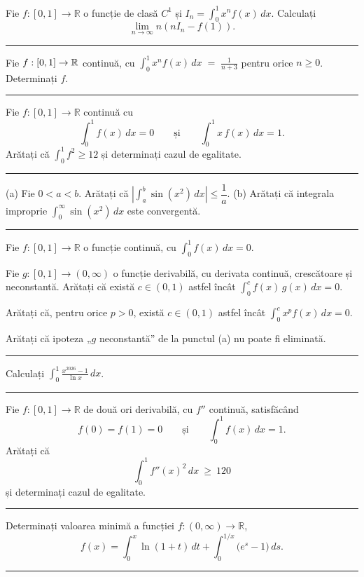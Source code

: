 Fie $f:[0,1]\to\mathbb{R}$ o funcție de clasă $C^1$ și
$\displaystyle I_n=\int_0^1 x^n f(x)\,dx$. Calculați
\[ \lim_{n\to\infty} n\left(n I_n - f(1)\right). \]
\vspace{1mm}\hrule

Fie $f : [0,1] \to \mathbb{R}$ continuă, cu $\displaystyle\int_0^1 x^n f(x)\,dx \;=\; \frac{1}{n+3}$ pentru orice $n \ge 0$. Determinați $f$.
\vspace{1mm}\hrule

Fie $f:[0,1]\to\mathbb{R}$ continuă cu
\[ \int_0^1f(x)\,dx=0\qquad\text{și}\qquad\int_0^1x\,f(x)\,dx=1 . \]
Arătați că $\displaystyle\int_0^1f^2\ge12$ și determinați cazul de egalitate.
\vspace{1mm}\hrule

(a) Fie $0<a<b$. Arătați că $\left|\displaystyle\int_a^b\sin(x^2)\,dx\right|\le\dfrac1a$.
(b) Arătați că integrala improprie $\displaystyle\int_0^\infty\sin(x^2)\,dx$ este convergentă.
\vspace{1mm}\hrule

Fie $f:[0,1]\to\mathbb{R}$ o funcție continuă, cu $\displaystyle\int_0^1 f(x)\,dx=0$.
\begin{parti}
  \item Fie $g:[0,1]\to(0,\infty)$ o funcție derivabilă, cu derivata continuă,
        crescătoare și neconstantă. Arătați că există $c\in(0,1)$ astfel încât
        $\displaystyle\int_0^c f(x)\,g(x)\,dx=0$.
  \item Arătați că, pentru orice $p>0$, există $c\in(0,1)$ astfel încât
        $\displaystyle\int_0^c x^{p}f(x)\,dx=0$.
  \item Arătați că ipoteza „$g$ neconstantă'' de la punctul (a) nu poate fi eliminată.
\end{parti}
\vspace{1mm}\hrule

Calculați $\displaystyle\int_0^1\frac{x^{2026}-1}{\ln x}\,dx$.
\vspace{1mm}\hrule

Fie $f:[0,1]\to\mathbb{R}$ de două ori derivabilă, cu $f''$ continuă, satisfăcând
\[ f(0)=f(1)=0\qquad\text{și}\qquad\int_{0}^{1}f(x)\,dx=1 . \]
Arătați că
\[ \int_{0}^{1}f''(x)^{2}\,dx\ \ge\ 120 \]
și determinați cazul de egalitate.
\vspace{1mm}\hrule

Determinați valoarea minimă a funcției $f : (0,\infty) \to \mathbb{R}$,
\[
  f(x) = \int_0^x \ln(1+t)\,dt + \int_0^{1/x} \bigl(e^{s}-1\bigr)\,ds.
\]
\vspace{1mm}\hrule

